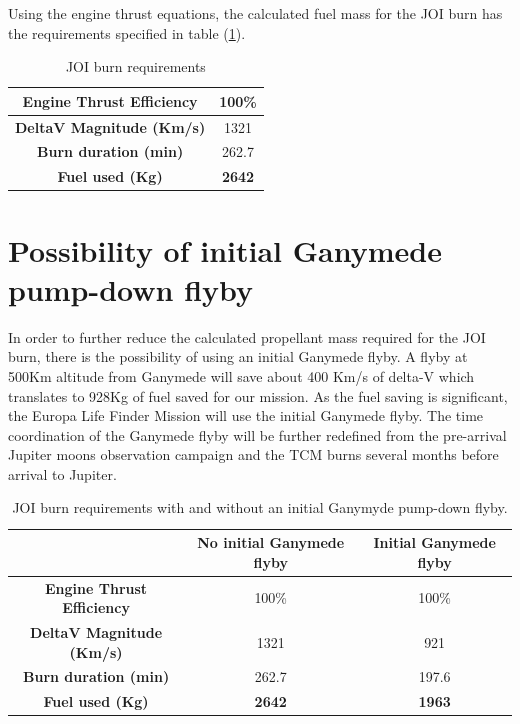 \noindent
Using the engine thrust equations, the calculated fuel mass for the JOI burn has the requirements specified in table (\ref{tab:joi_burn_req}).

\begin{table}[htb!]
  \centering
    \begin{tabular}{|c|c|}
    \hline
    \textbf{Engine Thrust Efficiency} & 100\% \bigstrut\\
    \hline
    \textbf{DeltaV Magnitude (Km/s)} & 1321\bigstrut\\
    \hline
    \textbf{Burn duration (min)} & 262.7\bigstrut\\
    \hline
    \textbf{Fuel used (Kg)} & \textbf{2642}\bigstrut\\
    \hline
    \end{tabular}%
    \caption{JOI burn requirements}
  \label{tab:joi_burn_req}%
\end{table}%
\newpage
\section{Possibility of initial Ganymede pump-down flyby}
In order to further reduce the calculated propellant mass required for the JOI burn, there is the possibility of using an initial Ganymede flyby. A flyby at 500Km altitude from Ganymede will save about 400 Km/s of delta-V \cite{clipper} which translates to 928Kg of fuel saved for our mission. As the fuel saving is significant, the Europa Life Finder Mission will use the initial Ganymede flyby. The time coordination of the Ganymede flyby will be further redefined from the pre-arrival Jupiter moons observation campaign and the TCM burns several months before arrival to Jupiter.

\begin{table}[htb!]
  \centering
    \begin{tabular}{|c|c|c|}
    \hline
    \textbf{} & No initial Ganymede flyby & Initial Ganymede flyby \bigstrut\\
    \hline
    \textbf{Engine Thrust Efficiency} & 100\% & 100\% \bigstrut\\
    \hline
    \textbf{DeltaV Magnitude (Km/s)} & 1321  & 921 \bigstrut\\
    \hline
    \textbf{Burn duration (min)} & 262.7 & 197.6 \bigstrut\\
    \hline
    \textbf{Fuel used (Kg)} & \textbf{2642} & \textbf{1963} \bigstrut\\
    \hline
    \end{tabular}%
    \caption{JOI burn requirements with and without an initial Ganymyde pump-down flyby.}
  \label{tab:joi_burn}%
\end{table}%

